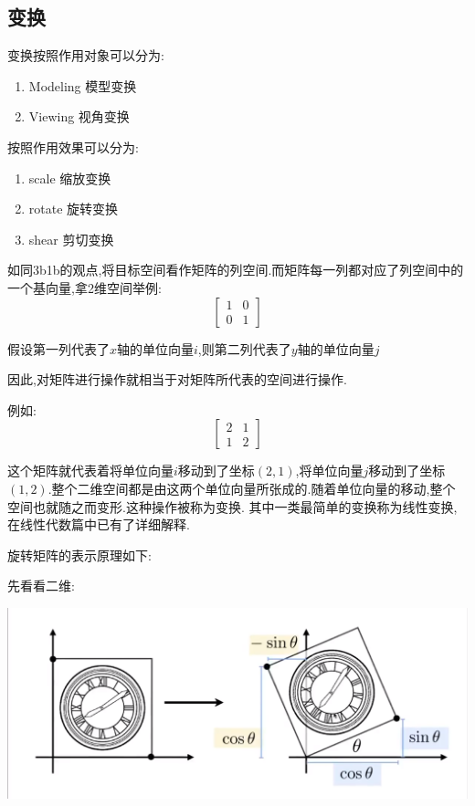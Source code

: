 \documentclass[UTF8,12pt]{ctexbook}
\begin{document}
{{    \subsection{变换}{
      变换按照作用对象可以分为:
      \begin{enumerate}
        \item Modeling 模型变换
        \item Viewing 视角变换
      \end{enumerate}

      按照作用效果可以分为:
      \begin{enumerate}
        \item scale 缩放变换
        \item rotate 旋转变换
        \item shear 剪切变换
      \end{enumerate}

      如同3b1b的观点,将目标空间看作矩阵的列空间.而矩阵每一列都对应了列空间中的一个基向量,拿2维空间举例:
      $$
        \begin{bmatrix}
          1 & 0 \\
          0 & 1
        \end{bmatrix}
      $$

      假设第一列代表了$x$轴的单位向量$i$,则第二列代表了$y$轴的单位向量$j$

      因此,对矩阵进行操作就相当于对矩阵所代表的空间进行操作.

      例如:$$
        \begin{bmatrix}
          2 & 1 \\
          1 & 2
        \end{bmatrix}
      $$

      这个矩阵就代表着将单位向量$i$移动到了坐标$(2,1)$,将单位向量$j$移动到了坐标$(1,2)$.整个二维空间都是由这两个单位向量所张成的.随着单位向量的移动,整个空间也就随之而变形.这种操作被称为变换.
      其中一类最简单的变换称为线性变换,在线性代数篇中已有了详细解释.

      旋转矩阵的表示原理如下:

      先看看二维:

      \includegraphics[scale=0.25]{resources/rotateMatrixGraphics.png}

}}}
\end{document}
